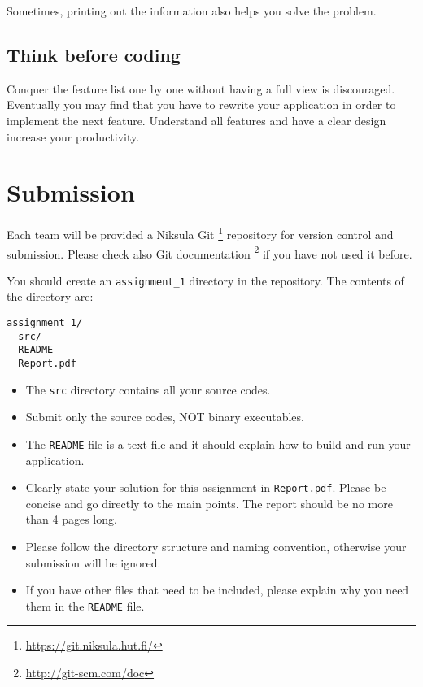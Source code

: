 \documentclass[12pt, a4paper]{article}
\begin{document}
Sometimes, printing out the information also helps you solve the problem.

\subsection*{Think before coding}
Conquer the feature list one by one without having a full view is discouraged.
Eventually you may find that you have to rewrite your application in order to implement the next feature.
Understand all features and have a clear design increase your productivity.


\section{Submission}
Each team will be provided a Niksula Git \footnote{\url{https://git.niksula.hut.fi/}} repository for version control and submission.
Please check also Git documentation \footnote{\url{http://git-scm.com/doc}} if you have not used it before.

You should create an \texttt{assignment\_1} directory in the repository.
The contents of the directory are:
\begin{verbatim}
assignment_1/
  src/
  README
  Report.pdf
\end{verbatim}

\begin{itemize}
\item The \texttt{src} directory contains all your source codes.
\item Submit only the source codes, NOT binary executables.
\item The \texttt{README} file is a text file and it should explain how to build and run your application.
\item Clearly state your solution for this assignment in \texttt{Report.pdf}. Please be concise and go directly to the main points. The report should be no more than 4 pages long.
\item Please follow the directory structure and naming convention, otherwise your submission will be ignored.
\item If you have other files that need to be included, please explain why you need them in the \texttt{README} file.
\end{itemize}
\end{document}

